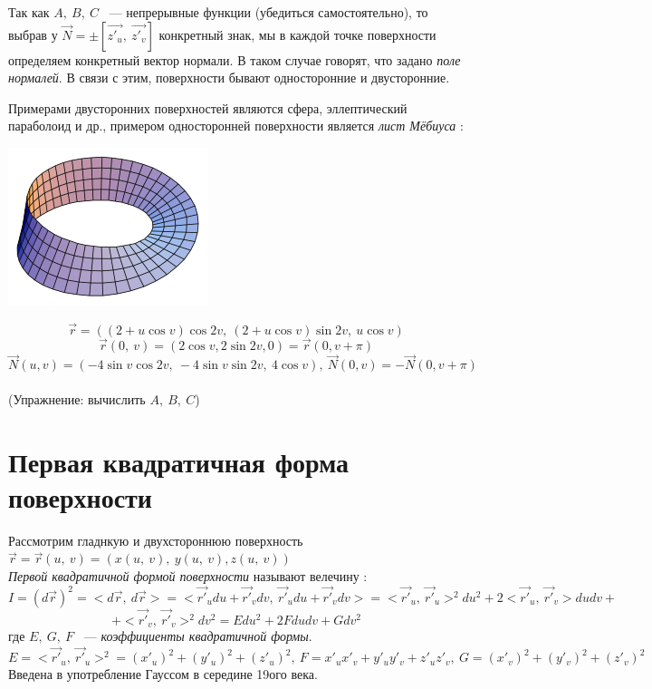 \documentclass[../../main.tex]{subfiles}
\begin{document}
Так как $A, \ B, \ C$ ~--- непрерывные функции (убедиться самостоятельно), то 
выбрав у $\vec{N} = \pm\left[ \vec{z'_u}, \ \vec{z'_v}\right]$ конкретный 
знак, мы в каждой точке поверхности определяем конкретный вектор нормали. В 
таком случае говорят, что задано \emph{поле нормалей}. В связи с этим, 
поверхности бывают односторонние и двусторонние.

Примерами двусторонних поверхностей являются сфера, эллептический параболоид и 
др., примером односторонней поверхности является \emph{лист Мёбиуса} : \\

\begin{center}
\includegraphics[scale = 0.5]{lec22_0.png}
\end{center}

\[\vec{r} = ((2 + u\cos v)\cos2v, \ (2 + u\cos v)\sin2v, \ u\cos v)\]
\[\vec{r}(0, \ v) = (2\cos v, 2\sin2v, 0) = \vec{r}(0, v + \pi)\]
\[\vec{N}(u, v) = (-4\sin v\cos2v, \ -4\sin v\sin2v, \ 4\cos v), \ \vec{N}(0, 
v) = -\vec{N}(0, v + \pi)\]\\
(Упражнение: вычислить $A, \ B, \ C$)
\section{Первая квадратичная форма поверхности}

Рассмотрим гладнкую и двухстороннюю поверхность $\vec{r} = \vec{r}(u, \ v) = 
(x(u, \ v), \ y(u, \ v), z(u, \ v))$\\

 \emph{Первой квадратичной формой поверхности} называют велечину : 
 \[I = (d\vec{r})^2 = <d\vec{r}, \ d\vec{r}> = <\vec{r'}_udu + \vec{r'}_vdv, \ 
 \vec{r'}_udu + \vec{r'}_vdv> = <\vec{r'}_u, \ \vec{r'}_u>^2du^2 + 
 2<\vec{r'}_u, \ \vec{r'}_v>dudv + \] \[ + <\vec{r'}_v, \ \vec{r'}_v>^2dv^2 = 
 Edu^2 + 2Fdudv + Gdv^2\]
 где $E, \ G, \ F$ ~--- \emph{коэффициенты квадратичной формы}.\\
\[E = <\vec{r'}_u, \ \vec{r'}_u>^2 = (x'_u)^2 + (y'_u)^2 + (z'_u)^2, \ 
F = x'_ux'_v + y'_uy'_v + z'_uz'_v, \ G = (x'_v)^2 + (y'_v)^2 + (z'_v)^2\]
Введена в употребление Гауссом в середине 19ого века.
\end{document}
